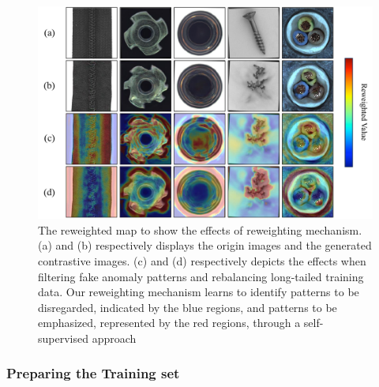 \documentclass[letterpaper]{article} %
\begin{document}
\begin{figure}[!t]
    \centering
    \includegraphics[width=1\linewidth]{images/reweighted_map.pdf}
    \caption{The reweighted map to show the effects of reweighting mechanism. (a) and (b) respectively displays the origin images and the generated contrastive images. (c) and (d) respectively depicts the effects when filtering fake anomaly patterns and rebalancing long-tailed training data. Our reweighting mechanism learns to identify patterns to be disregarded, indicated by the blue regions, and patterns to be emphasized, represented by the red regions, through a self-supervised approach} %
    \label{fig:reweightmap}
\end{figure}

\subsubsection{Preparing the Training set} 
\end{document}
